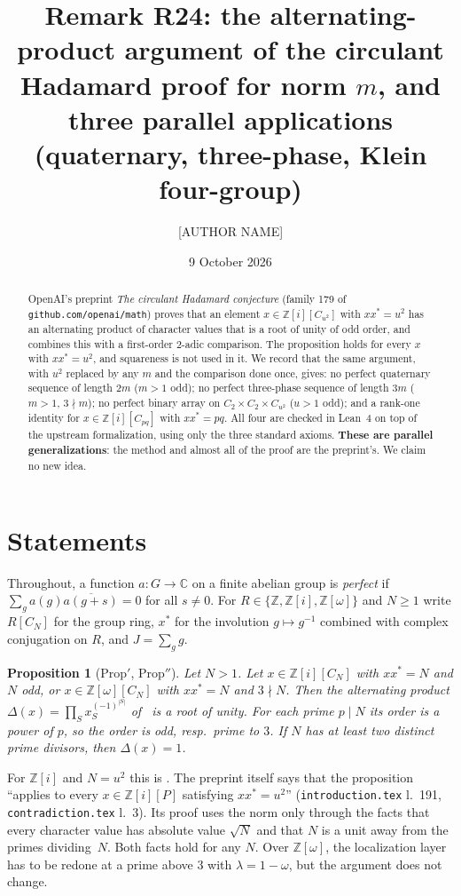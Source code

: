 \documentclass[11pt]{amsart}
\title[Norm-$m$ form of the alternating-product argument]{Remark R24: the alternating-product
argument of the circulant Hadamard proof for norm $m$, and three
parallel applications (quaternary, three-phase, Klein four-group)}
\author{[AUTHOR NAME]}
\date{9 October 2026}
\newtheorem{proposition}[theorem]{Proposition}
\theoremstyle{remark}
\newcommand{\Z}{\mathbb{Z}}
\newcommand{\C}{\mathbb{C}}
\begin{document}
\begin{abstract}
OpenAI's preprint \emph{The circulant Hadamard conjecture} (family 179 of
\texttt{github.com/openai/math}) proves that an element $x\in\Z[i][C_{u^2}]$ with
$xx^*=u^2$ has an alternating product of character values that is a root of unity of
odd order, and combines this with a first-order $2$-adic comparison. The
proposition holds for every $x$ with $xx^*=u^2$, and squareness is not used in it.
We record that the same argument, with $u^2$ replaced by any $m$ and the comparison
done once, gives: no perfect quaternary sequence of length $2m$ ($m>1$ odd); no
perfect three-phase sequence of length $3m$ ($m>1$, $3\nmid m$); no perfect binary
array on $C_2\times C_2\times C_{u^2}$ ($u>1$ odd); and a rank-one identity for
$x\in\Z[i][C_{pq}]$ with $xx^*=pq$. All four are checked in Lean~4 on top of
the upstream formalization, using only the three standard axioms. \textbf{These are parallel
generalizations}: the method and almost all of the proof are the preprint's. We
claim no new idea.
\end{abstract}
\maketitle

\section{Statements}
Throughout, a function $a:G\to\C$ on a finite abelian group is \emph{perfect} if
$\sum_{g}a(g)\overline{a(g+s)}=0$ for all $s\neq0$. For $R\in\{\Z,\Z[i],\Z[\omega]\}$
and $N\ge1$ write $R[C_N]$ for the group ring, $x^*$ for the involution
$g\mapsto g^{-1}$ combined with complex conjugation on $R$, and $J=\sum_g g$.

\begin{proposition}[Prop$'$, Prop$''$]\label{prop}
Let $N>1$. Let $x\in\Z[i][C_N]$ with $xx^*=N$ and $N$ odd, or $x\in\Z[\omega][C_N]$
with $xx^*=N$ and $3\nmid N$. Then the alternating product
$\Delta(x)=\prod_{S}x_S^{(-1)^{|S|}}$ of~\cite[\S3]{OAI179} is a root of unity.
For each prime $p\mid N$ its order is a power of $p$, so the order is odd, resp.\ prime to $3$.
If $N$ has at least two distinct prime divisors, then $\Delta(x)=1$.
\end{proposition}

For $\Z[i]$ and $N=u^2$ this is \cite[Prop.~3.4, \texttt{prop:alternating}]{OAI179}.
The preprint itself says that the proposition ``applies to every $x\in\Z[i][P]$
satisfying $xx^*=u^2$'' (\texttt{introduction.tex} l.~191,
\texttt{contradiction.tex} l.~3). Its proof uses the norm only through the facts
that every character value has absolute value $\sqrt N$ and that $N$ is a unit away
from the primes dividing~$N$. Both facts hold for any $N$. Over $\Z[\omega]$, the localization layer
has to be redone at a prime above $3$ with $\lambda=1-\omega$, but the argument does not change.
\end{document}
